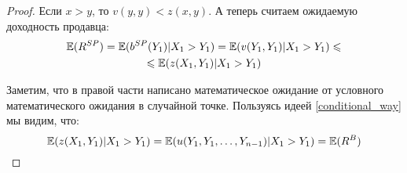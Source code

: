 \begin{proof}
Если $ x>y $, то $ v(y,y)<z(x,y) $. А теперь считаем ожидаемую доходность продавца:
\begin{multline}
\operatorname{\mathbb{E}}(R^{SP})=\operatorname{\mathbb{E}}(b^{SP}(Y_{1})|X_{1}>Y_{1})=\operatorname{\mathbb{E}}(v(Y_{1},Y_{1})|X_{1}>Y_{1})\leqslant\\
\leqslant \operatorname{\mathbb{E}}(z(X_{1},Y_{1})|X_{1}>Y_{1})
\end{multline}

Заметим, что в правой части написано математическое ожидание от условного математического ожидания в случайной точке. Пользуясь идеей \ref{conditional_way} мы видим, что:
\begin{equation}
\operatorname{\mathbb{E}}(z(X_{1},Y_{1})|X_{1}>Y_{1})=\operatorname{\mathbb{E}}(u(Y_{1},Y_{1},\ldots,Y_{n-1})|X_{1}>Y_{1})=\operatorname{\mathbb{E}}(R^{B})
\end{equation}

\end{proof}


